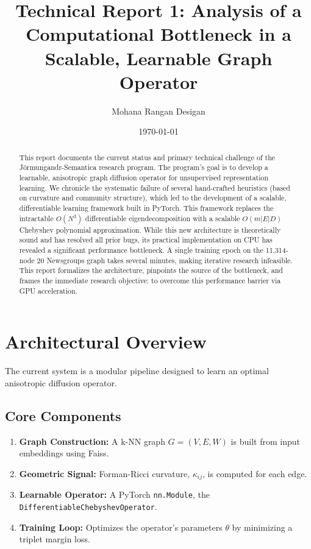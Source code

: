 \documentclass[11pt, letterpaper]{article}
\title{\textbf{Technical Report 1: Analysis of a Computational Bottleneck in a Scalable, Learnable Graph Operator}}
\author{Mohana Rangan Desigan}
\date{\today}
\begin{document}
\maketitle

\begin{abstract}
This report documents the current status and primary technical challenge of the Jörmungandr-Semantica research program. The program's goal is to develop a learnable, anisotropic graph diffusion operator for unsupervised representation learning. We chronicle the systematic failure of several hand-crafted heuristics (based on curvature and community structure), which led to the development of a scalable, differentiable learning framework built in PyTorch. This framework replaces the intractable $O(N^3)$ differentiable eigendecomposition with a scalable $O(m|E|D)$ Chebyshev polynomial approximation. While this new architecture is theoretically sound and has resolved all prior bugs, its practical implementation on CPU has revealed a significant performance bottleneck. A single training epoch on the 11,314-node 20 Newsgroups graph takes several minutes, making iterative research infeasible. This report formalizes the architecture, pinpoints the source of the bottleneck, and frames the immediate research objective: to overcome this performance barrier via GPU acceleration.
\end{abstract}

\section{Architectural Overview}
The current system is a modular pipeline designed to learn an optimal anisotropic diffusion operator.

\subsection{Core Components}
\begin{enumerate}
    \item \textbf{Graph Construction:} A k-NN graph $G=(V, E, W)$ is built from input embeddings using Faiss.
    \item \textbf{Geometric Signal:} Forman-Ricci curvature, $\kappa_{ij}$, is computed for each edge.
    \item \textbf{Learnable Operator:} A PyTorch \texttt{nn.Module}, the \texttt{DifferentiableChebyshevOperator}.
    \item \textbf{Training Loop:} Optimizes the operator's parameters $\theta$ by minimizing a triplet margin loss.
\end{enumerate}
\end{document}

